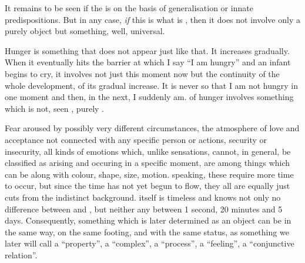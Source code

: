 It remains to be seen if the  is  on the
basis of generalisation or innate predispositions.  But in any case, {\em if}
this is what is , then it does not involve only a purely
 object but something, well, universal.

Hunger is something that does not appear just like that. It increases gradually.
When it eventually hits the barrier at which I say ``I am hungry'' and an infant
begins to cry, it involves not just this moment now but the continuity of the
whole development, of its gradual increase. It is never so that I am not hungry
in one moment and then, in the next, I suddenly am.  of hunger
involves something which is not, seen , purely .

Fear aroused by possibly very different circumstances, the atmosphere of love
and acceptance not connected with any specific person or actions, security or
insecurity, all kinds of emotions which, unlike sensations, cannot, in general,
be classified as arising and occuring in a specific moment, are among things
which can be  along with colour, shape, size, motion.
 speaking, these  require more time to occur,
but since the time has not yet begun to flow, they all are equally just
{cuts} from the indistinct background.  itself is
timeless and knows not only no difference between  and , but
neither any between 1 second, 20 minutes and 5 days.  Consequently, something
which is later determined as an object can be  in the same
way, on the same footing, and with the same status, as something we later will
call a ``property'', a ``complex'', a ``process'', a ``feeling'', a
``conjunctive relation''.
%
%


